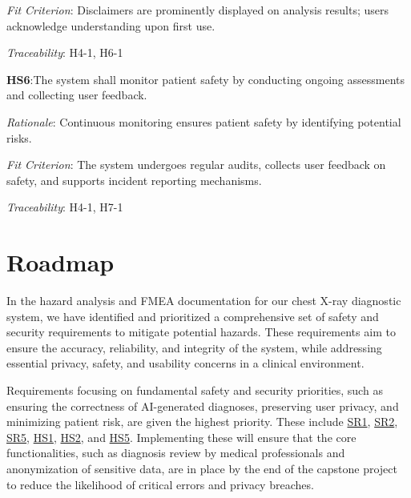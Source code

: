 \documentclass{article}
\begin{document}
\emph{Fit Criterion}: Disclaimers are prominently displayed on analysis results; users acknowledge understanding upon first use.

\vspace{0.2cm}

\emph{Traceability}: H4-1, H6-1

\vspace{0.5cm}

\textbf{HS6}:\hypertarget{HS6}{The system shall monitor patient safety by conducting ongoing assessments and collecting user feedback.}
\vspace{0.2cm}

\emph{Rationale}: Continuous monitoring ensures patient safety by identifying potential risks.

\vspace{0.2cm}

\emph{Fit Criterion}: The system undergoes regular audits, collects user feedback on safety, and supports incident reporting mechanisms.

\vspace{0.2cm}

\emph{Traceability}: H4-1, H7-1


\section{Roadmap}

In the hazard analysis and FMEA documentation for our chest X-ray diagnostic system, we have identified and prioritized a comprehensive set of safety and security requirements to mitigate potential hazards. These requirements aim to ensure the accuracy, reliability, and integrity of the system, while addressing essential privacy, safety, and usability concerns in a clinical environment.

\vspace{0.2cm}

\noindent Requirements focusing on fundamental safety and security priorities, such as ensuring the correctness of AI-generated diagnoses, preserving user privacy, and minimizing patient risk, are given the highest priority. These include \hyperlink{SR1}{SR1}, \hyperlink{SR2}{SR2}, \hyperlink{SR5}{SR5}, \hyperlink{HS1}{HS1}, \hyperlink{HS2}{HS2}, and \hyperlink{HS5}{HS5}. Implementing these will ensure that the core functionalities, such as diagnosis review by medical professionals and anonymization of sensitive data, are in place by the end of the capstone project to reduce the likelihood of critical errors and privacy breaches.
\vspace{0.2cm}
\end{document}
